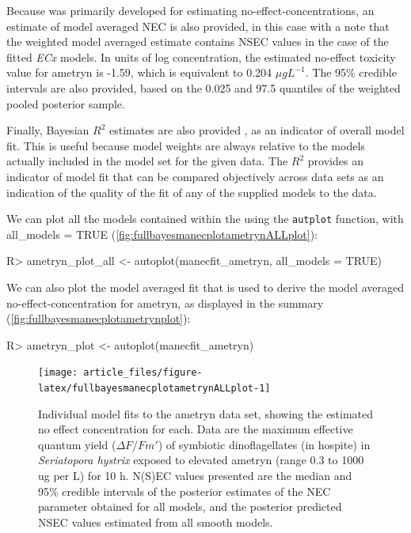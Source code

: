 \documentclass[
  shortnames]{jss}
\begin{document}
Because  was primarily developed for estimating no-effect-concentrations, an estimate of model averaged NEC is also provided, in this case with a note that the weighted model averaged estimate contains NSEC \citep{Fisher2023} values in the case of the fitted \emph{ECx} models. In units of log concentration, the estimated no-effect toxicity value for ametryn is -1.59, which is equivalent to 0.204 \({\mu}gL^{-1}\). The 95\% credible intervals are also provided, based on the 0.025 and 97.5 quantiles of the weighted pooled posterior sample.

Finally, Bayesian \(R^2\) estimates are also provided \citep{gelman2019}, as an indicator of overall model fit. This is useful because model weights are always relative to the models actually included in the model set for the given data. The \(R^2\) provides an indicator of model fit that can be compared objectively across data sets as an indication of the quality of the fit of any of the supplied models to the data.

We can plot all the models contained within the  using the \texttt{autplot} function, with all\_models = TRUE (\autoref{fig:fullbayesmanecplotametrynALLplot}):

\begin{CodeChunk}
\begin{CodeInput}
R> ametryn_plot_all <- autoplot(manecfit_ametryn, all_models = TRUE)
\end{CodeInput}
\end{CodeChunk}

We can also plot the model averaged fit that is used to derive the model averaged no-effect-concentration for ametryn, as displayed in the summary (\autoref{fig:fullbayesmanecplotametrynplot}):

\begin{CodeChunk}
\begin{CodeInput}
R> ametryn_plot <- autoplot(manecfit_ametryn)
\end{CodeInput}
\end{CodeChunk}

\begin{CodeChunk}
\begin{figure}[!ht]

{\centering \texttt{[image: article\_files/figure-latex/fullbayesmanecplotametrynALLplot-1]} 

}

\caption{Individual model fits to the ametryn data set, showing the estimated no effect concentration for each. Data are the maximum effective quantum yield ($\Delta F / Fm'$) of symbiotic dinoflagellates (in hospite) in \textit{Seriatopora hystrix} exposed to elevated ametryn (range 0.3 to 1000 ug per L) for 10 h. N(S)EC values presented are the median and 95\% credible intervals of the posterior estimates of the NEC parameter obtained for all  models, and the posterior predicted NSEC values estimated from all smooth  models.}\label{fig:fullbayesmanecplotametrynALLplot}
\end{figure}
\end{CodeChunk}
\end{document}
